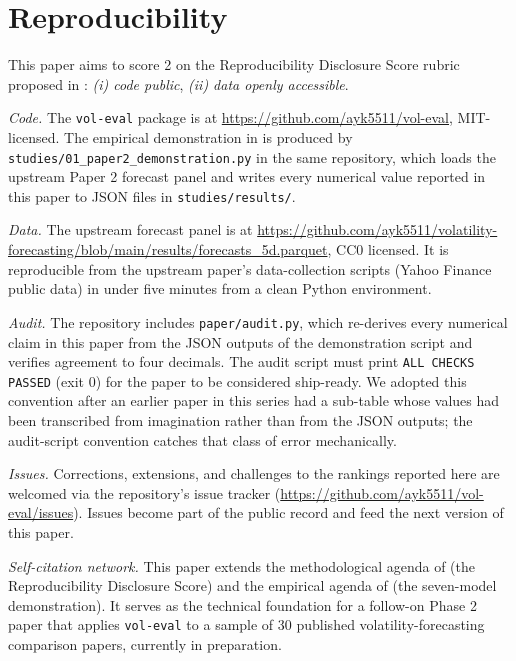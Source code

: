 \section{Reproducibility}\label{sec:reproducibility}

This paper aims to score 2 on the Reproducibility Disclosure Score rubric proposed in \citet{Khan2026Survey}: \emph{(i) code public}, \emph{(ii) data openly accessible}.

\textit{Code.} The \texttt{vol-eval} package is at \url{https://github.com/ayk5511/vol-eval}, MIT-licensed. The empirical demonstration in  is produced by \texttt{studies/01\_paper2\_demonstration.py} in the same repository, which loads the upstream Paper 2 forecast panel and writes every numerical value reported in this paper to JSON files in \texttt{studies/results/}.

\textit{Data.} The upstream forecast panel is at \url{https://github.com/ayk5511/volatility-forecasting/blob/main/results/forecasts_5d.parquet}, CC0 licensed. It is reproducible from the upstream paper's data-collection scripts (Yahoo Finance public data) in under five minutes from a clean Python environment.

\textit{Audit.} The repository includes \texttt{paper/audit.py}, which re-derives every numerical claim in this paper from the JSON outputs of the demonstration script and verifies agreement to four decimals. The audit script must print \texttt{ALL CHECKS PASSED} (exit 0) for the paper to be considered ship-ready. We adopted this convention after an earlier paper in this series \citep{KhanVol2026} had a sub-table whose values had been transcribed from imagination rather than from the JSON outputs; the audit-script convention catches that class of error mechanically.

\textit{Issues.} Corrections, extensions, and challenges to the rankings reported here are welcomed via the repository's issue tracker (\url{https://github.com/ayk5511/vol-eval/issues}). Issues become part of the public record and feed the next version of this paper.

\textit{Self-citation network.} This paper extends the methodological agenda of \citet{Khan2026Survey} (the Reproducibility Disclosure Score) and the empirical agenda of \citet{KhanVol2026} (the seven-model demonstration). It serves as the technical foundation for a follow-on Phase 2 paper that applies \texttt{vol-eval} to a sample of 30 published volatility-forecasting comparison papers, currently in preparation.
